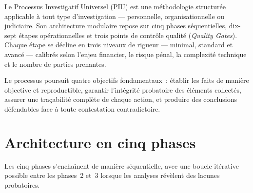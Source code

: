 \documentclass[11pt, a4paper]{article}
\begin{document}
Le Processus Investigatif Universel (PIU) est une m\'{e}thodologie structur\'{e}e applicable
\`{a} tout type d'investigation --- personnelle, organisationnelle ou judiciaire. Son
architecture modulaire repose sur cinq phases s\'{e}quentielles, dix-sept \'{e}tapes
op\'{e}rationnelles et trois points de contr\^{o}le qualit\'{e} (\textit{Quality Gates}).
Chaque \'{e}tape se d\'{e}cline en trois niveaux de rigueur --- minimal, standard et avanc\'{e}
--- calibr\'{e}s selon l'enjeu financier, le risque p\'{e}nal, la complexit\'{e} technique et
le nombre de parties prenantes.

Le processus poursuit quatre objectifs fondamentaux~: \'{e}tablir les faits de mani\`{e}re
objective et reproductible, garantir l'int\'{e}grit\'{e} probatoire des \'{e}l\'{e}ments
collect\'{e}s, assurer une tra\c{c}abilit\'{e} compl\`{e}te de chaque action, et produire des
conclusions d\'{e}fendables face \`{a} toute contestation contradictoire.

\section{Architecture en cinq phases}

Les cinq phases s'encha\^{i}nent de mani\`{e}re s\'{e}quentielle, avec une boucle
it\'{e}rative possible entre les phases~2 et~3 lorsque les analyses r\'{e}v\`{e}lent des
lacunes probatoires.
\end{document}
